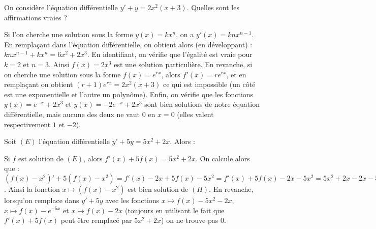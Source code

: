 \begin{question}
On considère l'équation différentielle $y'+y = 2x^2(x+3)$. Quelles sont les affirmations vraies ?
\begin{answers}
\end{answers}
\begin{explanations}
Si l'on cherche une solution sous la forme $y(x) = kx^n$, on a $y'(x) = kn x^{n-1}$. En remplaçant dans l'équation différentielle, on obtient alors (en développant) : $ kn x^{n-1} + k x^n = 6x^2 + 2x^3 $. En identifiant, on vérifie que l'égalité est vraie pour $k=2$ et $n=3$. Ainsi $f(x) = 2x^3$ est une solution particulière. En revanche, si on cherche une solution sous la forme $f(x) = e^{rx}$, alors $f'(x) = r e^{rx}$, et en remplaçant on obtient $ (r+1)e^{rx} = 2x^2(x+3)$ ce qui est impossible (un côté est une exponentielle et l'autre un polynôme). Enfin, on vérifie que les fonctions $y(x) = e^{-x} + 2x^3$ et $y(x) = -2e^{-x}+2x^3$ sont bien solutions de notre équation différentielle, mais aucune des deux ne vaut $0$ en $x=0$ (elles valent respectivement $1$ et $-2$).
\end{explanations}
\end{question}


\begin{question}
Soit $(E)$ l'équation différentielle $y'+5y = 5x^2 + 2x$. Alors :
\begin{answers}
\end{answers}
\begin{explanations}
Si $f$ est solution de $(E)$, alors $f'(x) + 5f(x) = 5x^2 + 2x$. On calcule alors que : $(f(x)-x^2)' + 5(f(x)-x^2) = f'(x) - 2x + 5f(x) - 5x^2 = f'(x)+5f(x) - 2x - 5x^2 = 5x^2+2x-2x-5x^2 = 0$. Ainsi la fonction $x \mapsto (f(x)-x^2)$ est bien solution de $(H)$. En revanche, lorsqu'on remplace dans $y'+5y$ avec les fonctions $x \mapsto f(x)-5x^2-2x$, $x \mapsto f(x)-e^{-5x}$ et $x \mapsto f(x)-2x$ (toujours en utilisant le fait que $f'(x)+5f(x)$ peut être remplacé par $5x^2+2x$) on ne trouve pas $0$.
\end{explanations}
\end{question}


